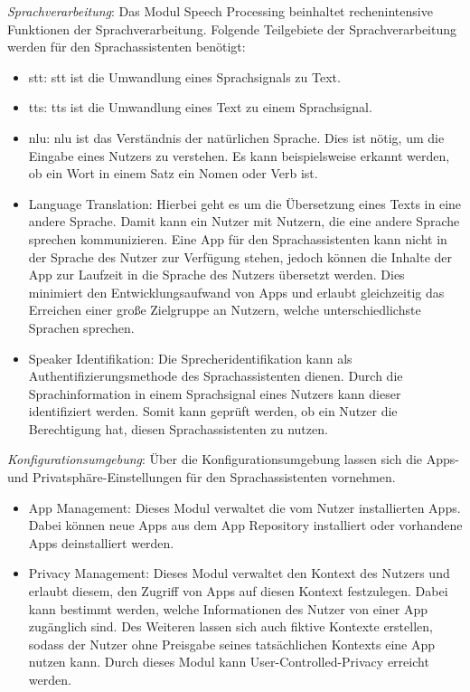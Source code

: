 \begin{description}
	\item \textit{Sprachverarbeitung}: Das Modul Speech Processing beinhaltet rechenintensive Funktionen der Sprachverarbeitung. Folgende Teilgebiete der Sprachverarbeitung werden für den Sprachassistenten benötigt:
	\begin{itemize}
		\item \ac{stt}: \ac{stt} ist die Umwandlung eines Sprachsignals zu Text.
		\item \ac{tts}: \ac{tts} ist die Umwandlung eines Text zu einem Sprachsignal.
		\item \ac{nlu}: \ac{nlu} ist das Verständnis der natürlichen Sprache. Dies ist nötig, um die Eingabe eines Nutzers zu verstehen. Es kann beispielsweise erkannt werden, ob ein Wort in einem Satz ein Nomen oder Verb ist. 
		\item Language Translation: Hierbei geht es um die Übersetzung eines Texts in eine andere Sprache. Damit kann ein Nutzer mit Nutzern, die eine andere Sprache sprechen kommunizieren. Eine App für den Sprachassistenten kann nicht in der Sprache des Nutzer zur Verfügung stehen, jedoch können die Inhalte der App zur Laufzeit in die Sprache des Nutzers übersetzt werden. Dies minimiert den Entwicklungsaufwand von Apps und erlaubt gleichzeitig das Erreichen einer große Zielgruppe an Nutzern, welche unterschiedlichste Sprachen sprechen. 
		\item Speaker Identifikation: Die Sprecheridentifikation kann als Authentifizierungsmethode des Sprachassistenten dienen. Durch die Sprachinformation in einem Sprachsignal eines Nutzers kann dieser identifiziert werden. Somit kann geprüft werden, ob ein Nutzer die Berechtigung hat, diesen Sprachassistenten zu nutzen.
	\end{itemize}
	\item \textit{Konfigurationsumgebung}: Über die Konfigurationsumgebung lassen sich die Apps- und Privatsphäre-Einstellungen für den Sprachassistenten vornehmen.
	\begin{itemize}
		\item App Management: Dieses Modul verwaltet die vom Nutzer installierten Apps. Dabei können neue Apps aus dem App Repository installiert oder vorhandene Apps deinstalliert werden.
		\item Privacy Management: Dieses Modul verwaltet den Kontext des Nutzers und erlaubt diesem, den Zugriff von Apps auf diesen Kontext festzulegen. Dabei kann bestimmt werden, welche Informationen des Nutzer von einer App zugänglich sind. Des Weiteren lassen sich auch fiktive Kontexte erstellen, sodass der Nutzer ohne Preisgabe seines tatsächlichen Kontexts eine App nutzen kann. Durch dieses Modul kann User-Controlled-Privacy erreicht werden. 
	\end{itemize}	
\end{description}





